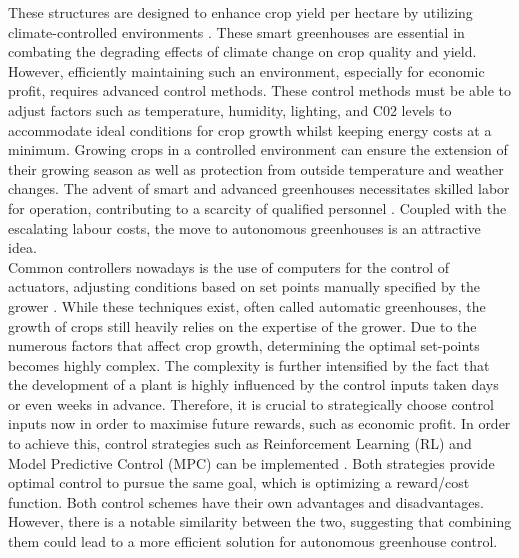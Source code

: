 These structures are designed to enhance crop yield per hectare by utilizing climate-controlled environments \cite{morcegoReinforcementLearningModel2023}. These smart greenhouses are essential in combating the degrading effects of climate change on crop quality and yield. However, efficiently maintaining such an environment, especially for economic profit, requires advanced control methods. These control methods must be able to adjust factors such as temperature, humidity, lighting, and C02 levels to accommodate ideal conditions for crop growth \cite{devopsGreenhouseClimateControl2021} whilst keeping energy costs at a minimum. Growing crops in a controlled environment can ensure the extension of their growing season as well as protection from outside temperature and weather changes. The advent of smart and advanced greenhouses necessitates skilled labor for operation, contributing to a scarcity of qualified personnel \cite{rusnakWhatCurrentState2018}. Coupled with the escalating labour costs, the move to autonomous greenhouses is an attractive idea. \\


 Common controllers nowadays is the use of computers for the control of actuators, adjusting conditions based on set points manually specified by the grower \cite{zhangMethodologiesControlStrategies2020}. While these techniques exist, often called automatic greenhouses, the growth of crops still heavily relies on the expertise of the grower. Due to the numerous factors that affect crop growth, determining the optimal set-points becomes highly complex. The complexity is further intensified by the fact that the development of a plant is highly influenced by the control inputs taken days or even weeks in advance. Therefore, it is crucial to strategically choose control inputs now in order to maximise future rewards, such as economic profit. In order to achieve this, control strategies such as Reinforcement Learning (RL) and Model Predictive Control (MPC) can be implemented \cite{zhangMethodologiesControlStrategies2020}. Both strategies provide optimal control to pursue the same goal, which is optimizing a reward/cost function. Both control schemes have their own advantages and disadvantages. However, there is a notable similarity between the two, suggesting that combining them could lead to a more efficient solution for autonomous greenhouse control.

